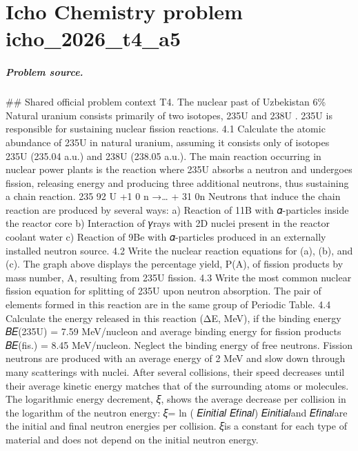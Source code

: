 
\chapter{Icho Chemistry problem icho\_2026\_t4\_a5}
\label{ch:IChO2026Problems_problem_icho_2026_t4_a5}

\paragraph{Problem source.}
\#\# Shared official problem context
T4. The nuclear past of Uzbekistan 6\% Natural uranium consists primarily of two isotopes, 235U and 238U . 235U is responsible for sustaining nuclear fission reactions. 4.1 Calculate the atomic abundance of 235U in natural uranium, assuming it consists only of isotopes 235U (235.04 a.u.) and 238U (238.05 a.u.). The main reaction occurring in nuclear power plants is the reaction where 235U absorbs a neutron and undergoes fission, releasing energy and producing three additional neutrons, thus sustaining a chain reaction. 235 92 U +1 0 n →… + 31 0n Neutrons that induce the chain reaction are produced by several ways: a) Reaction of 11B with 𝛼-particles inside the reactor core b) Interaction of 𝛾rays with 2D nuclei present in the reactor coolant water c) Reaction of 9Be with 𝛼-particles produced in an externally installed neutron source. 4.2 Write the nuclear reaction equations for (a), (b), and (c). The graph above displays the percentage yield, P(A), of fission products by mass number, A, resulting from 235U fission. 4.3 Write the most common nuclear fission equation for splitting of 235U upon neutron absorption. The pair of elements formed in this reaction are in the same group of Periodic Table. 4.4 Calculate the energy released in this reaction (ΔE, MeV), if the binding energy 𝐵𝐸(235U) = 7.59 MeV/nucleon and average binding energy for fission products 𝐵𝐸(fis.) = 8.45 MeV/nucleon. Neglect the binding energy of free neutrons. Fission neutrons are produced with an average energy of 2 MeV and slow down through many scatterings with nuclei. After several collisions, their speed decreases until their average kinetic energy matches that of the surrounding atoms or molecules. The logarithmic energy decrement, 𝜉, shows the average decrease per collision in the logarithm of the neutron energy: 𝜉= ln ( 𝐸𝑖𝑛𝑖𝑡𝑖𝑎𝑙 𝐸𝑓𝑖𝑛𝑎𝑙) 𝐸𝑖𝑛𝑖𝑡𝑖𝑎𝑙and 𝐸𝑓𝑖𝑛𝑎𝑙are the initial and final neutron energies per collision. 𝜉is a constant for each type of material and does not depend on the initial neutron energy.

